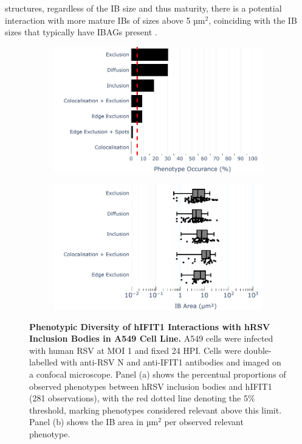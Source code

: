 structures, regardless of the IB size and thus maturity, there is a potential interaction with more mature IBs of sizes above 5 \(\mbox{µm}^2\), coinciding with the IB sizes that typically have IBAGs present \cite{Rincheval2017FunctionalVirus}.

\begin{figure}
    \begin{subfigure}{0.495\textwidth}
        \caption{}
        \includegraphics[width=1\linewidth]{08. Chapter 3/Figs/02. Infection/01. IFIT1/01. bar_i1_a549.pdf} 
    \end{subfigure}
    \begin{subfigure}{0.495\textwidth}
        \caption{}
        \includegraphics[width=1\linewidth]{08. Chapter 3/Figs/02. Infection/01. IFIT1/02. box_i1_a549.pdf}
    \end{subfigure}
    \caption[Phenotypic Diversity of hIFIT1 Interactions with hRSV Inclusion Bodies in A549 Cell Line.]{\textbf{Phenotypic Diversity of hIFIT1 Interactions with hRSV Inclusion Bodies in A549 Cell Line.} A549 cells were infected with human RSV at MOI 1 and fixed 24 HPI. Cells were double-labelled with anti-RSV N and anti-IFIT1 antibodies and imaged on a confocal microscope. Panel (a) shows the percentual proportions of observed phenotypes between hRSV inclusion bodies and hIFIT1 (281 observations), with the red dotted line denoting the 5\% threshold, marking phenotypes considered relevant above this limit. Panel (b) shows the IB area in \(\mbox{µm}^2\) per observed relevant phenotype.}
    \label{fig:Phenotypic Diversity of hIFIT1 Interactions with hRSV Inclusion Bodies in A549 Cell Line}
\end{figure}

